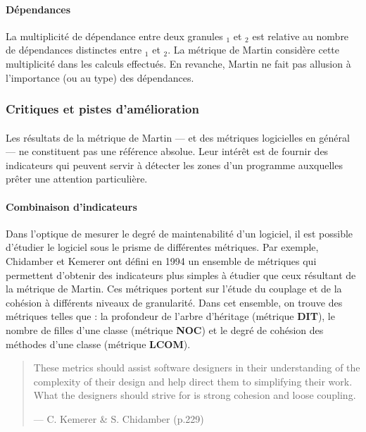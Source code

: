 \documentclass{scrartcl}
\begin{document}
    \paragraph{Dépendances}La multiplicité de dépendance entre deux granules \granule{}$_1$ et \granule{}$_2$ est relative au nombre de dépendances distinctes entre \granule{}$_1$ et \granule{}$_2$. La métrique de Martin considère cette multiplicité dans les calculs effectués. En revanche, Martin ne fait pas allusion à l'importance (ou au type) des dépendances.
    



\subsubsection{Critiques et pistes d'amélioration}

    \paragraph{}Les résultats de la métrique de Martin --- et des métriques logicielles en général --- ne constituent pas une référence absolue. Leur intérêt est de fournir des indicateurs qui peuvent servir à détecter les zones d'un programme auxquelles prêter une attention particulière.
    
    \paragraph{Combinaison d'indicateurs}Dans l'optique de mesurer le degré de maintenabilité d'un logiciel, il est possible d'étudier le logiciel sous le prisme de différentes métriques.
    Par exemple, Chidamber et Kemerer ont défini en 1994 un ensemble de métriques\cite{ChidamberKemerer:1994} qui permettent d'obtenir des indicateurs plus simples à étudier que ceux résultant de la métrique de Martin. Ces métriques portent sur l'étude du couplage et de la cohésion à différents niveaux de granularité.
    Dans cet ensemble, on trouve des métriques telles que : la profondeur de l'arbre d'héritage (métrique \textbf{DIT}), le nombre de filles d'une classe (métrique \textbf{NOC}) et le degré de cohésion des méthodes d'une classe (métrique \textbf{LCOM}).
    
    \begin{quote}
        These metrics should assist software designers in their understanding of the complexity of their design and help direct them to simplifying their work. What the designers should strive for is strong cohesion and loose coupling.
        \begin{flushright}--- C. Kemerer \& S. Chidamber \cite{ChidamberKemerer:1994} (p.229)\end{flushright}
    \end{quote}
\end{document}
